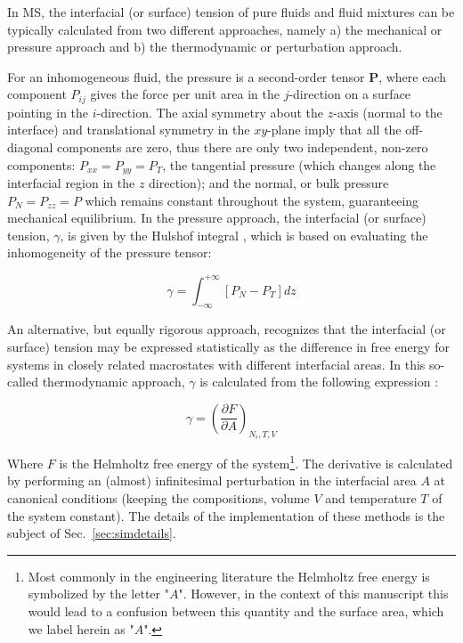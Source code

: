 \documentclass[9pt,tutorial]{livecoms}
\begin{document}
In MS, the interfacial (or surface) tension of pure fluids and
fluid mixtures can be typically calculated from two different approaches,
namely a) the mechanical or pressure approach and b) the thermodynamic or
perturbation approach.

For an inhomogeneous fluid, the pressure is a second-order tensor \textbf{P},
where each component $P_{ij}$ gives the force per unit area in the
$j$-direction on a surface pointing in the $i$-direction. The
axial symmetry about the $z$-axis (normal to the interface) and
translational symmetry in the $xy$-plane imply that all the off-diagonal
components are zero, thus there are only two independent, non-zero components:
$P_{xx} = P_{yy} = P_T$, the tangential pressure (which changes along the
interfacial region in the $z$ direction); and the normal, or bulk
pressure $P_{N} = P_{zz} = P$ which remains constant
throughout the system, guaranteeing mechanical equilibrium. In the
pressure approach, the interfacial (or surface) tension, $\gamma$, is given by the
Hulshof integral \citep{hulshof1901}, which
is based on evaluating the inhomogeneity of the pressure tensor:

\begin{equation}
\gamma=\int_{-\infty}^{+\infty}\left[P_{N}-P_{T}\right]dz
\label{eq:hulshof}
\end{equation}

An alternative, but equally rigorous approach, recognizes that the interfacial
(or surface) tension may be expressed statistically as the difference in free energy for
systems in closely related macrostates with different interfacial areas. In
this so-called thermodynamic approach, $\gamma$ is calculated from the
following expression \citep{gray2011,gloor2005,errington2007}:

\begin{equation}
\gamma=\left(\frac{\partial F}{\partial A}\right)_{N_{i},T,V}
\label{eq:2}
\end{equation}

Where $F$ is the Helmholtz free energy of the system\footnote{
Most commonly in the engineering literature the Helmholtz free energy is symbolized by the
letter "$A$". However, in the context of this manuscript this would lead
to a confusion between this quantity and the surface area, which we label herein as
"$A$".}.  The derivative is calculated by performing an (almost)
infinitesimal perturbation in the interfacial area $A$ at canonical conditions
(keeping the compositions, volume $V$ and temperature $T$ of the
system constant). The details of the implementation of these methods is the
subject of Sec.~\ref{sec:simdetails}.
\end{document}
